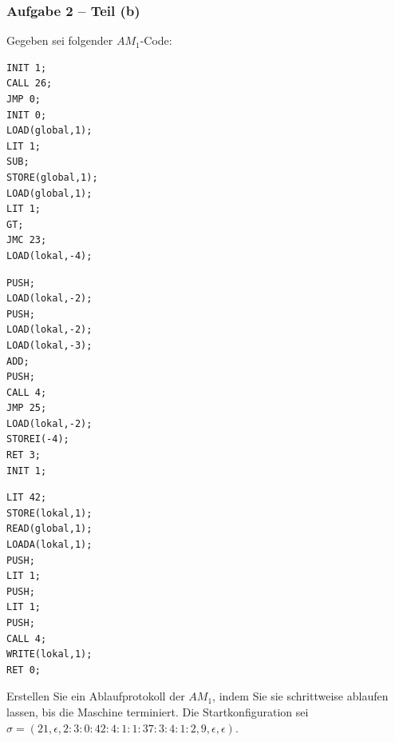 \documentclass{beamer}
\begin{document}
\begin{frame}[fragile, t] \frametitle{Aufgabe 2 -- Teil (b)}
	\footnotesize
	Gegeben sei folgender $AM_1$-Code: \\[-1em]	
	\begin{minipage}[t]{\dimexpr0.33\linewidth-\fboxrule-\fboxsep}
		\begin{lstlisting}[basicstyle=\scriptsize\ttfamily]
INIT 1;
CALL 26;
JMP 0;
INIT 0;
LOAD(global,1);
LIT 1;
SUB;
STORE(global,1);
LOAD(global,1);
LIT 1;
GT;
JMC 23;
LOAD(lokal,-4);
		\end{lstlisting}
	\end{minipage}
	\begin{minipage}[t]{\dimexpr0.33\linewidth-\fboxrule-\fboxsep}
		\begin{lstlisting}[basicstyle=\scriptsize\ttfamily, firstnumber=14]
PUSH;
LOAD(lokal,-2);
PUSH;
LOAD(lokal,-2);
LOAD(lokal,-3);
ADD;
PUSH;
CALL 4;
JMP 25;
LOAD(lokal,-2);
STOREI(-4);
RET 3;
INIT 1;
		\end{lstlisting}
	\end{minipage}
	\begin{minipage}[t]{\dimexpr0.33\linewidth-\fboxrule-\fboxsep}
		\begin{lstlisting}[basicstyle=\scriptsize\ttfamily, firstnumber=27]
LIT 42;
STORE(lokal,1);
READ(global,1);
LOADA(lokal,1);
PUSH;
LIT 1;
PUSH;
LIT 1;
PUSH;
CALL 4;
WRITE(lokal,1);
RET 0;
		\end{lstlisting}
	\end{minipage}

	Erstellen Sie ein Ablaufprotokoll der $AM_1$, indem Sie sie schrittweise ablaufen lassen, bis
	die Maschine terminiert. Die Startkonfiguration sei $\sigma = (21, \epsilon, 2 : 3 : 0 : 42 : 4 : 1 : 1 : 37 : 3 : 4 : 1 : 2, 9, \epsilon, \epsilon)$.
\end{frame}
\end{document}
